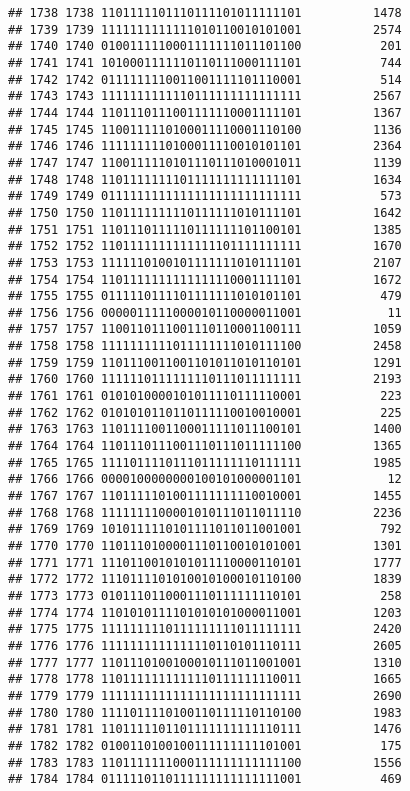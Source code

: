 \documentclass[]{article}
\begin{document}
\begin{verbatim}
## 1738 1738 1101111101110111101011111101          1478
## 1739 1739 1111111111111010110010101001          2574
## 1740 1740 0100111110001111111011101100           201
## 1741 1741 1010001111110110111000111101           744
## 1742 1742 0111111110011001111101110001           514
## 1743 1743 1111111111110111111111111111          2567
## 1744 1744 1101110111001111110001111101          1367
## 1745 1745 1100111110100011110001110100          1136
## 1746 1746 1111111110100011110010101101          2364
## 1747 1747 1100111110101110111010001011          1139
## 1748 1748 1101111111101111111111111101          1634
## 1749 1749 0111111111111111111111111111           573
## 1750 1750 1101111111110111111010111101          1642
## 1751 1751 1101110111110111111101100101          1385
## 1752 1752 1101111111111111101111111111          1670
## 1753 1753 1111110100101111111010111101          2107
## 1754 1754 1101111111111111110001111101          1672
## 1755 1755 0111110111101111111010101101           479
## 1756 1756 0000011111000010110000011001            11
## 1757 1757 1100110111001110110001100111          1059
## 1758 1758 1111111111011111111010111100          2458
## 1759 1759 1101110011001101011010110101          1291
## 1760 1760 1111110111111110111011111111          2193
## 1761 1761 0101010000101011110111110001           223
## 1762 1762 0101010110110111110010010001           225
## 1763 1763 1101111001100011111011100101          1400
## 1764 1764 1101110111001110111011111100          1365
## 1765 1765 1111011110111011111110111111          1985
## 1766 1766 0000100000000100101000001101            12
## 1767 1767 1101111101001111111110010001          1455
## 1768 1768 1111111100001010111011011110          2236
## 1769 1769 1010111110101111011011001001           792
## 1770 1770 1101110100001110110010101001          1301
## 1771 1771 1110110010101011110000110101          1777
## 1772 1772 1110111101010010100010110100          1839
## 1773 1773 0101110110001110111111110101           258
## 1774 1774 1101010111101010101000011001          1203
## 1775 1775 1111111110111111111011111111          2420
## 1776 1776 1111111111111110110101110111          2605
## 1777 1777 1101110100100010111011001001          1310
## 1778 1778 1101111111111110111111110011          1665
## 1779 1779 1111111111111111111111111111          2690
## 1780 1780 1111011110100110111110110100          1983
## 1781 1781 1101111101101111111111110111          1476
## 1782 1782 0100110100100111111111101001           175
## 1783 1783 1101111111000111111111111100          1556
## 1784 1784 0111110110111111111111111001           469

\end{verbatim}
\end{document}
